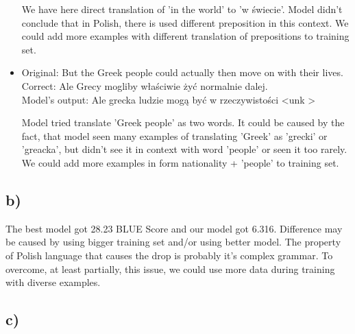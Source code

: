 \documentclass[12pt]{article}
\begin{document}
\begin{itemize}
        We have here direct translation of 'in the world' to 'w świecie'. Model didn't conclude that in Polish, there is used different preposition in this context. We could add more examples with different translation of prepositions to training set.
        
  \item Original: But the Greek people could actually then move on with their lives.\\
        Correct: Ale Grecy mogliby właściwie żyć normalnie dalej. \\
        Model's output: Ale grecka ludzie mogą być w rzeczywistości \textless unk \textgreater
        
        Model tried translate 'Greek people' as two words. It could be caused by the fact, that model seen many examples of translating 'Greek' as 'grecki' or 'greacka', but didn't see it in context with word 'people' or seen it too rarely. We could add more examples in form nationality + 'people' to training set.
\end{itemize}
\subsection*{b) }
The best model got 28.23 BLUE Score and our model got 6.316. Difference may be caused by using bigger training set and/or using better model. The property of Polish language that causes the drop is probably it's complex grammar. To overcome, at least partially, this issue, we could use more data during training with diverse examples.
 
\subsection*{c) }
\end{document}
